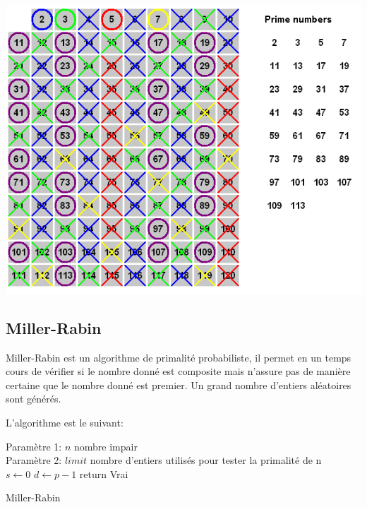 \documentclass[a4paper, 12pt]{article}
\begin{document}
\begin{center}
    \includegraphics[width=0.8\linewidth]{eratosthene.png}
\end{center}

\newpage
\subsection{Miller-Rabin}

Miller-Rabin est un algorithme de primalité probabiliste, il permet en un temps cours de vérifier si le 
nombre donné est composite mais n'assure pas de manière certaine que le nombre donné est premier.
Un grand nombre d'entiers aléatoires sont générés.

L'algorithme est le suivant:

\begin{algorithm}[H]
\SetAlgoLined
Paramètre 1: $n$ nombre impair \\
Paramètre 2: $limit$ nombre d'entiers utilisés pour tester la primalité de n \\
    $s \xleftarrow{} 0$ \;
    $d \xleftarrow{} p - 1$ \;
    return Vrai \;
\caption{Miller-Rabin}
\end{algorithm}
\end{document}
